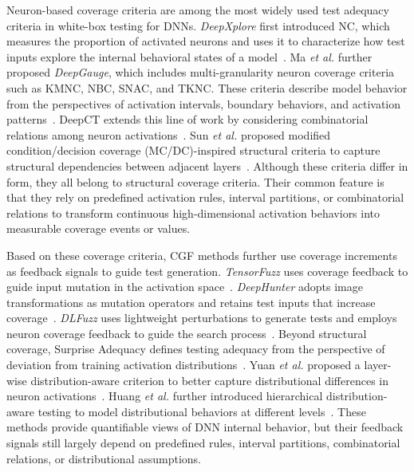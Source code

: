 \documentclass[preprint,number,5p,twocolumn]{elsarticle}
\begin{document}
Neuron-based coverage criteria are among the most widely used test adequacy criteria in white-box testing for DNNs. \textit{DeepXplore} first introduced NC, which measures the proportion of activated neurons and uses it to characterize how test inputs explore the internal behavioral states of a model~\cite{PeiCYJ19}. Ma \emph{et al.} further proposed \textit{DeepGauge}, which includes multi-granularity neuron coverage criteria such as KMNC, NBC, SNAC, and TKNC. These criteria describe model behavior from the perspectives of activation intervals, boundary behaviors, and activation patterns~\cite{MaJZSXLCSLLZW18}. DeepCT extends this line of work by considering combinatorial relations among neuron activations~\cite{MaJXLLLZ19}. Sun \emph{et al.} proposed modified condition/decision coverage (MC/DC)-inspired structural criteria to capture structural dependencies between adjacent layers~\cite{SunHKSHA19}. Although these criteria differ in form, they all belong to structural coverage criteria. Their common feature is that they rely on predefined activation rules, interval partitions, or combinatorial relations to transform continuous high-dimensional activation behaviors into measurable coverage events or values.

Based on these coverage criteria, CGF methods further use coverage increments as feedback signals to guide test generation. \textit{TensorFuzz} uses coverage feedback to guide input mutation in the activation space~\cite{OdenaOAG19}. \textit{DeepHunter} adopts image transformations as mutation operators and retains test inputs that increase coverage~\cite{XieMJXCLZLYS19}. \textit{DLFuzz} uses lightweight perturbations to generate tests and employs neuron coverage feedback to guide the search process~\cite{GuoJZCS18}. Beyond structural coverage, Surprise Adequacy defines testing adequacy from the perspective of deviation from training activation distributions~\cite{KimFY19}. Yuan \emph{et al.} proposed a layer-wise distribution-aware criterion to better capture distributional differences in neuron activations~\cite{YuanPW23}. Huang \emph{et al.} further introduced hierarchical distribution-aware testing to model distributional behaviors at different levels~\cite{HuangZBCH24}. These methods provide quantifiable views of DNN internal behavior, but their feedback signals still largely depend on predefined rules, interval partitions, combinatorial relations, or distributional assumptions.
\end{document}
